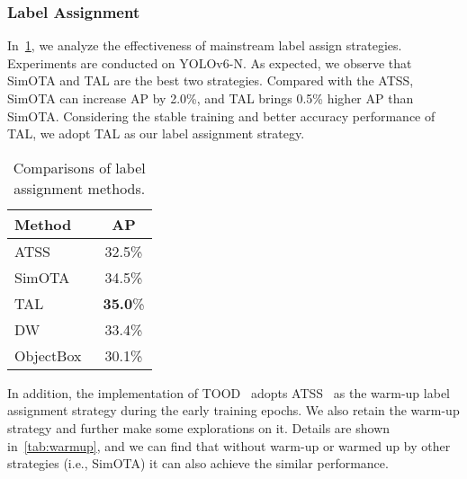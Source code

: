 \documentclass[10pt,twocolumn,letterpaper]{article}
\begin{document}
 
\subsubsection{Label Assignment}
\label{sec:exp:ablate:labelassign}
In~\cref{tab:label_assign}, we analyze the effectiveness of mainstream label assign strategies. Experiments are conducted on YOLOv6-N. As expected, we observe that SimOTA and TAL are the best two strategies. Compared with the ATSS, SimOTA can increase AP by 2.0\%, and TAL brings 0.5\% higher AP than SimOTA. Considering the stable training and better accuracy performance of TAL, we adopt TAL as our label assignment strategy.

 \begin{table}
  \centering
  \begin{tabular}{l|c}
    \toprule
    \textbf{Method} & \textbf{AP} \\
    \midrule
    \midrule
    ATSS~\cite{zhang2020atss} & 32.5\%  \\
    SimOTA~\cite{ge2021yolox} & 34.5\% \\
    TAL~\cite{feng2021tood} & \textbf{35.0}\% \\
    DW~\cite{dw_CVPR} & 33.4\%  \\
    ObjectBox~\cite{Zand2022ObjectBoxFC} & 30.1\% \\
    \bottomrule
  \end{tabular}
  \caption{Comparisons of label assignment methods.}
  \label{tab:label_assign}
\end{table}



In addition, the implementation of TOOD~\cite{feng2021tood} adopts ATSS~\cite{zhang2020atss} as the warm-up label assignment strategy during the early training epochs. We also retain the warm-up strategy and further make some explorations on it. Details are shown in~\cref{tab:warmup}, and we can find that without warm-up or warmed up by other strategies (i.e., SimOTA) it can also achieve the similar performance.

\begin{table}
  \centering
  \caption{Comparisons of label assignment methods in warm-up stage.}
  \label{tab:warmup}
\end{table}
\end{document}
